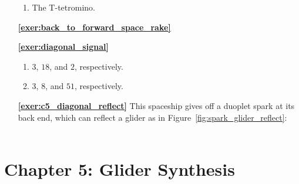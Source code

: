 \begin{multicols}{2}
\begin{itemize}[leftmargin=0em]
\begin{enumerate}[leftmargin=1.5em,label=\bf\color{ocre}(\alph*)]
			\item The T-tetromino. \\
		\end{enumerate}
		
		
		\item[\bf\color{ocre}\sffamily\ref{exer:back_to_forward_space_rake}]  \\
		
		
		\item[\bf\color{ocre}\sffamily\ref{exer:diagonal_signal}]
		\begin{enumerate}[leftmargin=1.5em,label=\bf\color{ocre}(\alph*)]
			\item $3$, $18$, and $2$, respectively. \\
			
			\item $3$, $8$, and $51$, respectively. \\
		\end{enumerate}
		
		
		\item[\bf\color{ocre}\sffamily\ref{exer:c5_diagonal_reflect}] This spaceship gives off a duoplet spark at its back end, which can reflect a glider as in Figure~\ref{fig:spark_glider_reflect}: \\[-0.6em]
		
		 \\
	\end{itemize}
\end{multicols}


\hypertarget{solutions_glider_synthesis}{}\label{solutions_glider_synthesis}
\section*{Chapter 5: Glider Synthesis}
\renewcommand{\chapterfolder}{glider_synthesis/}

